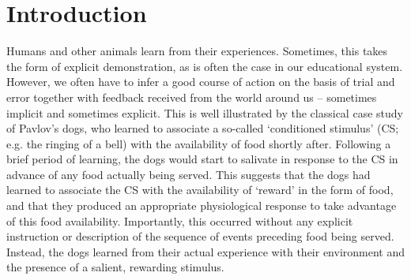 \section{Introduction}
\label{sec:intro}

Humans and other animals learn from their experiences.
Sometimes, this takes the form of explicit demonstration, as is often the case in our educational system.
However, we often have to infer a good course of action on the basis of trial and error together with feedback received from the world around us -- sometimes implicit and sometimes explicit.
This is well illustrated by the classical case study of Pavlov's dogs, who learned to associate a so-called `conditioned stimulus' (CS; e.g. the ringing of a bell) with the availability of food shortly after.
Following a brief period of learning, the dogs would start to salivate in response to the CS in advance of any food actually being served.
This suggests that the dogs had learned to associate the CS with the availability of `reward' in the form of food, and that they produced an appropriate physiological response to take advantage of this food availability.
Importantly, this occurred without any explicit instruction or description of the sequence of events preceding food being served.
Instead, the dogs learned from their actual experience with their environment and the presence of a salient, rewarding stimulus.

